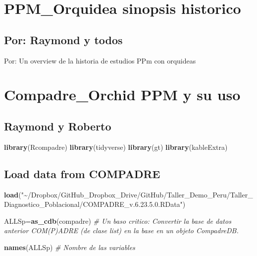 \documentclass[
]{book}
\newenvironment{Shaded}{\begin{snugshade}}{\end{snugshade}}
\newcommand{\CommentTok}[1]{\textcolor[rgb]{0.56,0.35,0.01}{\textit{#1}}}
\newcommand{\FunctionTok}[1]{\textcolor[rgb]{0.13,0.29,0.53}{\textbf{#1}}}
\newcommand{\NormalTok}[1]{#1}
\newcommand{\OtherTok}[1]{\textcolor[rgb]{0.56,0.35,0.01}{#1}}
\newcommand{\StringTok}[1]{\textcolor[rgb]{0.31,0.60,0.02}{#1}}
\theoremstyle{definition}
\theoremstyle{definition}
\theoremstyle{definition}
\theoremstyle{definition}
\theoremstyle{remark}
\begin{document}
\hypertarget{ppm_orquidea-sinopsis-historico}{%
\chapter{PPM\_Orquidea sinopsis historico}\label{ppm_orquidea-sinopsis-historico}}

\hypertarget{por-raymond-y-todos}{%
\section{Por: Raymond y todos}\label{por-raymond-y-todos}}

Por: Un overview de la historia de estudios PPm con orquideas

\hypertarget{compadre_orchid-ppm-y-su-uso}{%
\chapter{Compadre\_Orchid PPM y su uso}\label{compadre_orchid-ppm-y-su-uso}}

\hypertarget{raymond-y-roberto}{%
\section{Raymond y Roberto}\label{raymond-y-roberto}}

\begin{Shaded}
\begin{Highlighting}[]
\FunctionTok{library}\NormalTok{(Rcompadre)}
\FunctionTok{library}\NormalTok{(tidyverse)}
\FunctionTok{library}\NormalTok{(gt)}
\FunctionTok{library}\NormalTok{(kableExtra)}
\end{Highlighting}
\end{Shaded}

\hypertarget{load-data-from-compadre}{%
\section{\texorpdfstring{Load data from \textbf{COMPADRE}}{Load data from COMPADRE}}\label{load-data-from-compadre}}

\begin{Shaded}
\begin{Highlighting}[]
\FunctionTok{load}\NormalTok{(}\StringTok{"\textasciitilde{}/Dropbox/GitHub\_Dropbox\_Drive/GitHub/Taller\_Demo\_Peru/Taller\_Diagnostico\_Poblacional/COMPADRE\_v.6.23.5.0.RData"}\NormalTok{)}

\NormalTok{ALLSp}\OtherTok{=}\FunctionTok{as\_cdb}\NormalTok{(compadre)  }\CommentTok{\# Un baso critico: Convertir la base de datos anterior COM(P)ADRE (de clase \textquotesingle{}list\textquotesingle{}) en la base en un objeto CompadreDB.}

\FunctionTok{names}\NormalTok{(ALLSp) }\CommentTok{\# Nombre de las variables}
\end{Highlighting}
\end{Shaded}
\end{document}
